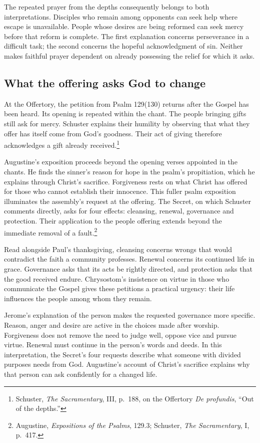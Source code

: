 The repeated prayer from the depths consequently belongs to both interpretations. Disciples who remain among opponents can seek help where escape is unavailable. People whose desires are being reformed can seek mercy before that reform is complete. The first explanation concerns perseverance in a difficult task; the second concerns the hopeful acknowledgment of sin. Neither makes faithful prayer dependent on already possessing the relief for which it asks.

\subsection{What the offering asks God to change}

At the Offertory, the petition from Psalm 129(130) returns after the Gospel has been heard. Its opening is repeated within the chant. The people bringing gifts still ask for mercy. Schuster explains their humility by observing that what they offer has itself come from God's goodness. Their act of giving therefore acknowledges a gift already received.\footnote{Schuster, \textit{The Sacramentary}, III, p.~188, on the Offertory \textit{De profundis}, ``Out of the depths.''}

Augustine's exposition proceeds beyond the opening verses appointed in the chants. He finds the sinner's reason for hope in the psalm's propitiation, which he explains through Christ's sacrifice. Forgiveness rests on what Christ has offered for those who cannot establish their innocence. This fuller psalm exposition illuminates the assembly's request at the offering. The Secret, on which Schuster comments directly, asks for four effects: cleansing, renewal, governance and protection. Their application to the people offering extends beyond the immediate removal of a fault.\footnote{Augustine, \textit{Expositions of the Psalms}, 129.3; Schuster, \textit{The Sacramentary}, I, p.~417.}

Read alongside Paul's thanksgiving, cleansing concerns wrongs that would contradict the faith a community professes. Renewal concerns its continued life in grace. Governance asks that its acts be rightly directed, and protection asks that the good received endure. Chrysostom's insistence on virtue in those who communicate the Gospel gives these petitions a practical urgency: their life influences the people among whom they remain.

Jerome's explanation of the person makes the requested governance more specific. Reason, anger and desire are active in the choices made after worship. Forgiveness does not remove the need to judge well, oppose vice and pursue virtue. Renewal must continue in the person's words and deeds. In this interpretation, the Secret's four requests describe what someone with divided purposes needs from God. Augustine's account of Christ's sacrifice explains why that person can ask confidently for a changed life.

